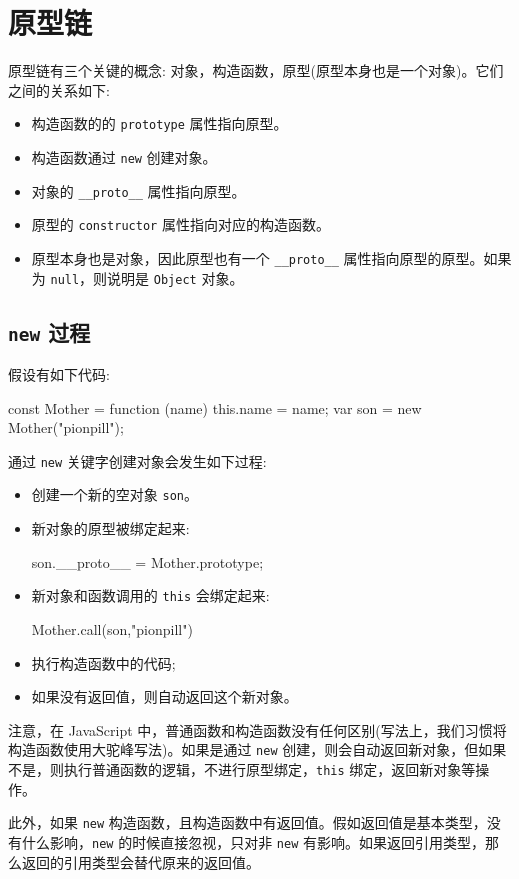 \section{原型链}

原型链有三个关键的概念: 对象，构造函数，原型(原型本身也是一个对象)。它们之间的关系如下:
\begin{itemize}
  \item 构造函数的的 \texttt{prototype} 属性指向原型。
  \item 构造函数通过 \texttt{new} 创建对象。
  \item 对象的 \texttt{\_\_proto\_\_} 属性指向原型。
  \item 原型的 \texttt{constructor} 属性指向对应的构造函数。
  \item 原型本身也是对象，因此原型也有一个 \texttt{\_\_proto\_\_} 属性指向原型的原型。如果为 \texttt{null}，则说明是 \texttt{Object} 对象。
\end{itemize}

\subsection{\texttt{new} 过程}

假设有如下代码:

\begin{JavaScript}
const Mother = function (name) {
  this.name = name;
}
var son = new Mother("pionpill");
\end{JavaScript}

通过 \texttt{new} 关键字创建对象会发生如下过程:
\begin{itemize}
  \item 创建一个新的空对象 \texttt{son}。
  \item 新对象的原型被绑定起来:
\begin{JavaScript}
son.__proto__ = Mother.prototype;
\end{JavaScript}
\item 新对象和函数调用的 \texttt{this} 会绑定起来:
\begin{JavaScript}
Mother.call(son,"pionpill")
\end{JavaScript}
  \item 执行构造函数中的代码;
  \item 如果没有返回值，则自动返回这个新对象。
\end{itemize}

注意，在 JavaScript 中，普通函数和构造函数没有任何区别(写法上，我们习惯将构造函数使用大驼峰写法)。如果是通过 \texttt{new} 创建，则会自动返回新对象，但如果不是，则执行普通函数的逻辑，不进行原型绑定，\texttt{this} 绑定，返回新对象等操作。

此外，如果 \texttt{new} 构造函数，且构造函数中有返回值。假如返回值是基本类型，没有什么影响，\texttt{new} 的时候直接忽视，只对非 \texttt{new} 有影响。如果返回引用类型，那么返回的引用类型会替代原来的返回值。